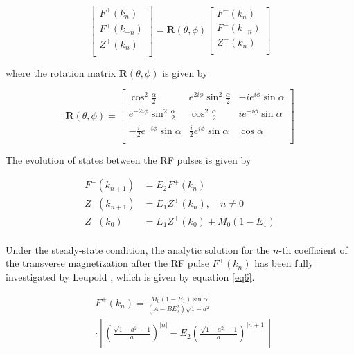\documentclass[AMA,STIX2COL,Linenumberson]{MRM}
\begin{document}
\begin{equation}
  \begin{bmatrix}
    F^+(k_n) \\
    F^+(k_{-n})\\
    Z^+(k_n) \\
  \end{bmatrix} = \mathbf{R}(\theta,\phi)
  \begin{bmatrix}
    F^-(k_n) \\
    F^-(k_{-n})\\
    Z^-(k_n) \\
  \end{bmatrix}
  \label{eq3}
\end{equation}

where the rotation matrix $\mathbf{R}(\theta,\phi)$ is given by

\begin{equation}
  \mathbf{R}(\theta,\phi) = 
  \begin{bmatrix}
    \cos^2 \frac{\alpha}{2} & e^{2i\phi} \sin^2 \frac{\alpha}{2} & -ie^{i\phi} \sin \alpha \\
    e^{-2i\phi} \sin^2 \frac{\alpha}{2} & \cos^2 \frac{\alpha}{2} & ie^{-i\phi} \sin \alpha \\
    -\frac{i}{2} e^{-i\phi} \sin \alpha & \frac{i}{2} e^{i\phi} \sin \alpha & \cos \alpha \\
  \end{bmatrix} 
  \label{eq4}
\end{equation}

The evolution of states between the RF pulses is given by

\begin{equation}
  \begin{aligned}
    F^-(k_{n+1}) &= E_2 F^+(k_n)\\
    Z^-(k_{n+1}) &= E_1 Z^+(k_n),\quad n\ne 0 \\
    Z^-(k_0) &= E_1 Z^+(k_0) + M_0(1-E_1)\\
  \end{aligned}
  \label{eq5}
\end{equation}


Under the steady-state condition, the analytic solution for the $n$-th coefficient of the transverse magnetization after the RF pulse $F^+(k_n)$ has been fully investigated by Leupold \cite{leupold2017steady}, which is given by equation \ref{eq6}.

\begin{equation}
  \begin{aligned}
    &F^+(k_n) = \frac{M_0(1-E_1)\sin\alpha}{(A-BE_2^2)\sqrt{1-a^2}}\\
    &\cdot\left[\left(\frac{\sqrt{1-a^2}-1}{a}\right)^{|n|} - E_2\left(\frac{\sqrt{1-a^2}-1}{a}\right)^{|n+1|}\right] 
  \end{aligned}
  \label{eq6}
\end{equation}
\end{document}
